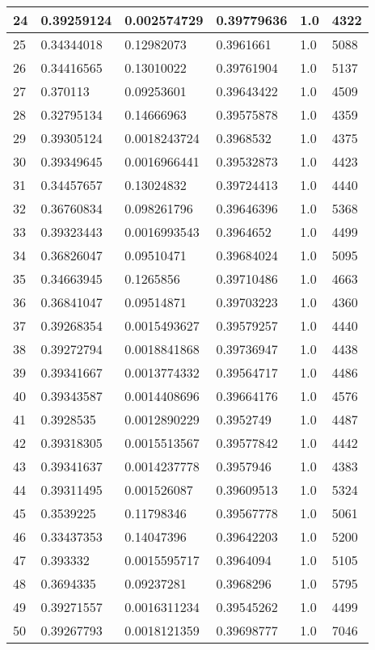 \begin{longtable}{|l|l|l|l|l|l|}
24 & 0.39259124 & 0.002574729 & 0.39779636 & 1.0 & 4322 \\ \hline 
25 & 0.34344018 & 0.12982073 & 0.3961661 & 1.0 & 5088 \\ \hline 
26 & 0.34416565 & 0.13010022 & 0.39761904 & 1.0 & 5137 \\ \hline 
27 & 0.370113 & 0.09253601 & 0.39643422 & 1.0 & 4509 \\ \hline 
28 & 0.32795134 & 0.14666963 & 0.39575878 & 1.0 & 4359 \\ \hline 
29 & 0.39305124 & 0.0018243724 & 0.3968532 & 1.0 & 4375 \\ \hline 
30 & 0.39349645 & 0.0016966441 & 0.39532873 & 1.0 & 4423 \\ \hline 
31 & 0.34457657 & 0.13024832 & 0.39724413 & 1.0 & 4440 \\ \hline 
32 & 0.36760834 & 0.098261796 & 0.39646396 & 1.0 & 5368 \\ \hline 
33 & 0.39323443 & 0.0016993543 & 0.3964652 & 1.0 & 4499 \\ \hline 
34 & 0.36826047 & 0.09510471 & 0.39684024 & 1.0 & 5095 \\ \hline 
35 & 0.34663945 & 0.1265856 & 0.39710486 & 1.0 & 4663 \\ \hline 
36 & 0.36841047 & 0.09514871 & 0.39703223 & 1.0 & 4360 \\ \hline 
37 & 0.39268354 & 0.0015493627 & 0.39579257 & 1.0 & 4440 \\ \hline 
38 & 0.39272794 & 0.0018841868 & 0.39736947 & 1.0 & 4438 \\ \hline 
39 & 0.39341667 & 0.0013774332 & 0.39564717 & 1.0 & 4486 \\ \hline 
40 & 0.39343587 & 0.0014408696 & 0.39664176 & 1.0 & 4576 \\ \hline 
41 & 0.3928535 & 0.0012890229 & 0.3952749 & 1.0 & 4487 \\ \hline 
42 & 0.39318305 & 0.0015513567 & 0.39577842 & 1.0 & 4442 \\ \hline 
43 & 0.39341637 & 0.0014237778 & 0.3957946 & 1.0 & 4383 \\ \hline 
44 & 0.39311495 & 0.001526087 & 0.39609513 & 1.0 & 5324 \\ \hline 
45 & 0.3539225 & 0.11798346 & 0.39567778 & 1.0 & 5061 \\ \hline 
46 & 0.33437353 & 0.14047396 & 0.39642203 & 1.0 & 5200 \\ \hline 
47 & 0.393332 & 0.0015595717 & 0.3964094 & 1.0 & 5105 \\ \hline 
48 & 0.3694335 & 0.09237281 & 0.3968296 & 1.0 & 5795 \\ \hline 
49 & 0.39271557 & 0.0016311234 & 0.39545262 & 1.0 & 4499 \\ \hline 
50 & 0.39267793 & 0.0018121359 & 0.39698777 & 1.0 & 7046 \\ \hline 
\end{longtable}